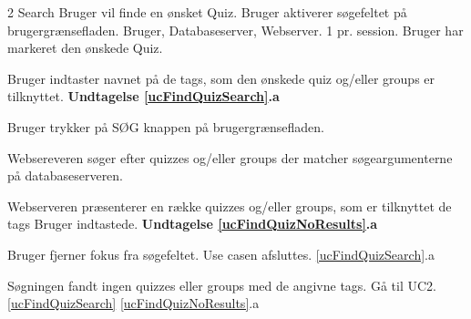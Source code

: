 \uchead
	{2}
	{Search}
	{Bruger vil finde en ønsket Quiz.}
	{Bruger aktiverer søgefeltet på brugergrænsefladen.}
	{Bruger, Databaseserver, Webserver.}
	{}
	{1 pr. session.}
	{Bruger har markeret den ønskede Quiz.}

\item \label{ucFindQuizSearch} Bruger indtaster navnet på de tags, som den ønskede quiz og/eller groups er tilknyttet. 
\textbf{Undtagelse \ref{ucFindQuizSearch}.a}
\item Bruger trykker på SØG knappen på brugergrænsefladen.
\item Websereveren søger efter quizzes og/eller groups der matcher søgeargumenterne på databaseserveren.

\item \label{ucFindQuizNoResults} Webserveren præsenterer en række quizzes og/eller groups, som er tilknyttet de tags Bruger indtastede.
\textbf{Undtagelse \ref{ucFindQuizNoResults}.a}


\ucdescriptionend

\ucextension
	{Bruger fjerner fokus fra søgefeltet.}
	{Use casen afsluttes.}
	{\ref{ucFindQuizSearch}.a}

\ucextension
	{Søgningen fandt ingen quizzes eller groups med de angivne tags.}
	{Gå til UC2.\ref{ucFindQuizSearch}}
	{\ref{ucFindQuizNoResults}.a}
				
